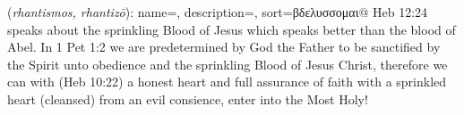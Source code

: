 \item[Sprinkled,]

(\textit{rhantismos, rhantizō}):
{
    name=,
    description={},
    sort=βδελυσσομαι@
}
Heb 12:24 speaks about the sprinkling Blood of Jesus which speaks better than the blood of Abel. In 1 Pet 1:2 we 
are predetermined by God the Father to be sanctified by the Spirit unto obedience and the sprinkling Blood of Jesus Christ, 
therefore we can with (Heb 10:22) a honest heart and full assurance of faith with a sprinkled heart (cleansed) from an evil
consience, enter into the Most Holy!

